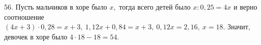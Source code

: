 56. Пусть мальчиков в хоре было $x,$ тогда всего детей было $x:0,25=4x$ и верно соотношение $(4x+3)\cdot0,28=x+3,\ 1,12x+0,84=x+3,\ 0,12x=2,16,\ x=18.$ Значит, девочек в хоре было $4\cdot18-18=54.$\\
